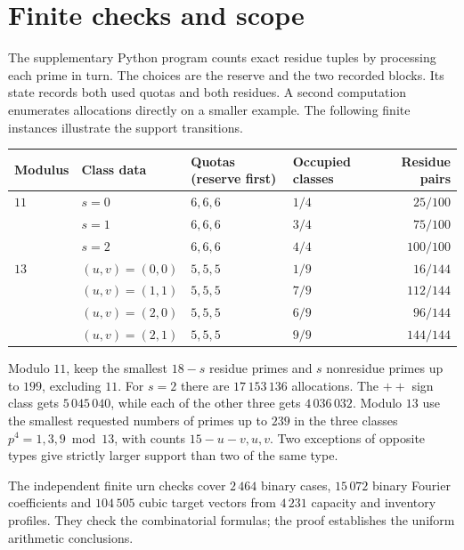 \documentclass[11pt,letterpaper]{article}
\begin{document}



\section{Finite checks and scope}
The supplementary Python program counts exact residue tuples by processing each prime in turn. The choices are the reserve and the two recorded blocks. Its state records both used quotas and both residues. A second computation enumerates allocations directly on a smaller example. The following finite instances illustrate the support transitions.

\begin{center}
\begin{tabular}{@{}llllr@{}}
\toprule
Modulus & Class data & Quotas (reserve first) & Occupied classes & Residue pairs\\
\midrule
\(11\) & \(s=0\) & \(6,6,6\) & \(1/4\) & \(25/100\)\\
       & \(s=1\) & \(6,6,6\) & \(3/4\) & \(75/100\)\\
       & \(s=2\) & \(6,6,6\) & \(4/4\) & \(100/100\)\\[2pt]
\(13\) & \((u,v)=(0,0)\) & \(5,5,5\) & \(1/9\) & \(16/144\)\\
       & \((u,v)=(1,1)\) & \(5,5,5\) & \(7/9\) & \(112/144\)\\
       & \((u,v)=(2,0)\) & \(5,5,5\) & \(6/9\) & \(96/144\)\\
       & \((u,v)=(2,1)\) & \(5,5,5\) & \(9/9\) & \(144/144\)\\
\bottomrule
\end{tabular}
\end{center}

Modulo \(11\), keep the smallest \(18-s\) residue primes and \(s\) nonresidue primes up to \(199\), excluding \(11\). For \(s=2\) there are \(17\,153\,136\) allocations. The \(++\) sign class gets \(5\,045\,040\), while each of the other three gets \(4\,036\,032\). Modulo \(13\) use the smallest requested numbers of primes up to \(239\) in the three classes \(p^4=1,3,9\bmod 13\), with counts \(15-u-v,u,v\). Two exceptions of opposite types give strictly larger support than two of the same type.

The independent finite urn checks cover \(2\,464\) binary cases, \(15\,072\) binary Fourier coefficients and \(104\,505\) cubic target vectors from \(4\,231\) capacity and inventory profiles. They check the combinatorial formulas; the proof establishes the uniform arithmetic conclusions.
\end{document}
